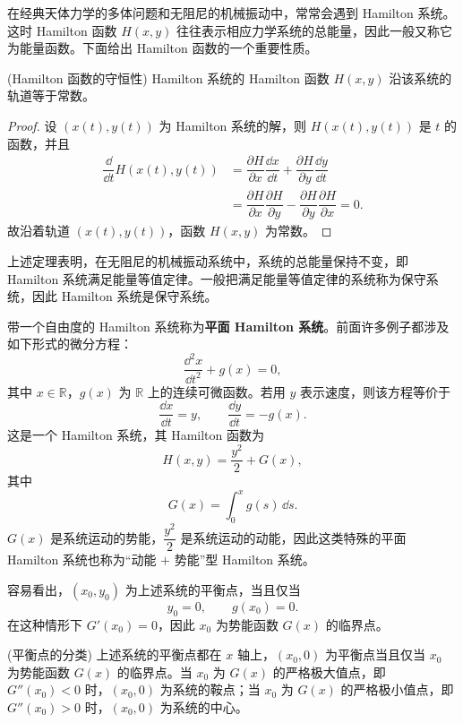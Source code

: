 在经典天体力学的多体问题和无阻尼的机械振动中，常常会遇到 Hamilton 系统。这时 Hamilton 函数 $H(x,y)$ 往往表示相应力学系统的总能量，因此一般又称它为能量函数。下面给出 Hamilton 函数的一个重要性质。

\begin{theorem}(Hamilton 函数的守恒性)\label{thm:Hamilton函数沿轨道守恒}
	Hamilton 系统的 Hamilton 函数 $H(x,y)$ 沿该系统的轨道等于常数。
\end{theorem}

\begin{proof}
	设 $(x(t),y(t))$ 为 Hamilton 系统的解，则 $H(x(t),y(t))$ 是 $t$ 的函数，并且
	\[
	\begin{aligned}
		\dfrac{\dd}{\dd t}H(x(t),y(t))
		&=\dfrac{\partial H}{\partial x}\dfrac{\dd x}{\dd t}
		 +\dfrac{\partial H}{\partial y}\dfrac{\dd y}{\dd t}\\
		&=\dfrac{\partial H}{\partial x}\dfrac{\partial H}{\partial y}
		 -\dfrac{\partial H}{\partial y}\dfrac{\partial H}{\partial x}=0.
	\end{aligned}
	\]
	故沿着轨道 $(x(t),y(t))$，函数 $H(x,y)$ 为常数。
\end{proof}

上述定理表明，在无阻尼的机械振动系统中，系统的总能量保持不变，即 Hamilton 系统满足能量等值定律。一般把满足能量等值定律的系统称为保守系统，因此 Hamilton 系统是保守系统。

带一个自由度的 Hamilton 系统称为\textbf{平面 Hamilton 系统}。前面许多例子都涉及如下形式的微分方程：
\[
	\dfrac{\dd^2x}{\dd t^2}+g(x)=0,
\]
其中 $x\in\mathbb R$，$g(x)$ 为 $\mathbb R$ 上的连续可微函数。若用 $y$ 表示速度，则该方程等价于
\[
	\dfrac{\dd x}{\dd t}=y,
	\qquad
	\dfrac{\dd y}{\dd t}=-g(x).
\]
这是一个 Hamilton 系统，其 Hamilton 函数为
\[
	H(x,y)=\dfrac{y^2}{2}+G(x),
\]
其中
\[
	G(x)=\int_0^x g(s)\,\dd s.
\]
$G(x)$ 是系统运动的势能，$\dfrac{y^2}{2}$ 是系统运动的动能，因此这类特殊的平面 Hamilton 系统也称为“动能 $+$ 势能”型 Hamilton 系统。

容易看出，$(x_0,y_0)$ 为上述系统的平衡点，当且仅当
\[
	y_0=0,\qquad g(x_0)=0.
\]
在这种情形下 $G'(x_0)=0$，因此 $x_0$ 为势能函数 $G(x)$ 的临界点。

\begin{theorem}(平衡点的分类)\label{thm:动能加势能型Hamilton系统平衡点分类}
	上述系统的平衡点都在 $x$ 轴上，$(x_0,0)$ 为平衡点当且仅当 $x_0$ 为势能函数 $G(x)$ 的临界点。当 $x_0$ 为 $G(x)$ 的严格极大值点，即 $G''(x_0)<0$ 时，$(x_0,0)$ 为系统的鞍点；当 $x_0$ 为 $G(x)$ 的严格极小值点，即 $G''(x_0)>0$ 时，$(x_0,0)$ 为系统的中心。
\end{theorem}

